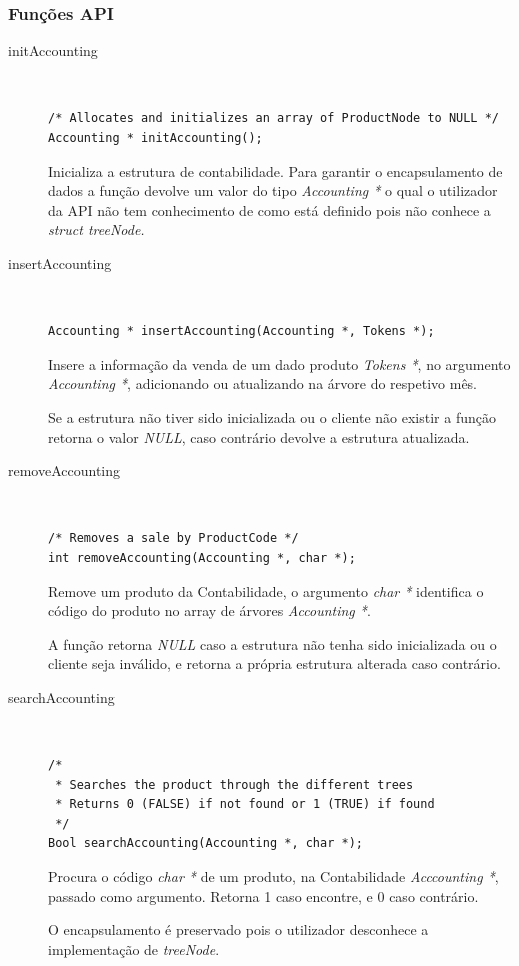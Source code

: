 \documentclass[10pt] {article}
\begin{document}
\subsubsection{Funções API}
\begin{description}
\item[initAccounting] \hfill \\
\begin{lstlisting}
/* Allocates and initializes an array of ProductNode to NULL */
Accounting * initAccounting();
\end{lstlisting}
\par
Inicializa a estrutura de contabilidade.  Para garantir o encapsulamento de dados a função devolve um valor do tipo \emph{Accounting *} o qual o utilizador da API
não tem conhecimento de como está definido pois não conhece a \emph{struct treeNode.} \\

\item[insertAccounting] \hfill \\
\begin{lstlisting}
Accounting * insertAccounting(Accounting *, Tokens *);
\end{lstlisting}
\par Insere a informação da venda de um dado produto \emph{Tokens *}, no argumento \emph{Accounting *}, adicionando ou atualizando na árvore do respetivo mês.
\par Se a estrutura não tiver sido inicializada ou o cliente não existir a função retorna o valor \emph{NULL},
caso contrário devolve a estrutura atualizada. \\

\item[removeAccounting] \hfill \\
\begin{lstlisting}
/* Removes a sale by ProductCode */
int removeAccounting(Accounting *, char *);
\end{lstlisting}
\par Remove um produto da Contabilidade, o argumento \emph{char *} identifica o código do produto no array de árvores \emph{Accounting *}.
\par A função retorna \emph{NULL} caso a estrutura não tenha sido inicializada ou o cliente seja inválido, e retorna a própria estrutura alterada caso contrário. \\

\item[searchAccounting] \hfill \\
\begin{lstlisting}
/*
 * Searches the product through the different trees
 * Returns 0 (FALSE) if not found or 1 (TRUE) if found
 */
Bool searchAccounting(Accounting *, char *);
\end{lstlisting}
\par Procura o código \emph{char *} de um produto, na Contabilidade \emph{Acccounting *}, passado como argumento. Retorna 1 caso encontre, e 0 caso contrário.
\par O encapsulamento é preservado pois o utilizador desconhece a implementação de \emph{treeNode}. \\


\end{description}
\end{document}
